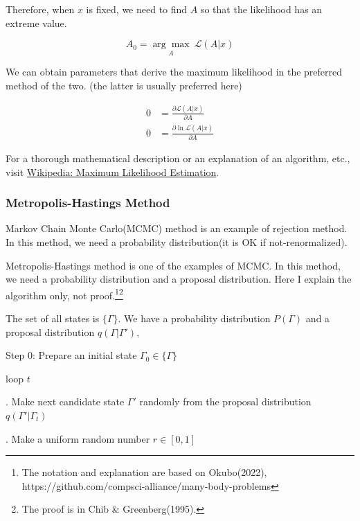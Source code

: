 Therefore, when $x$ is fixed, we need to find $A$ so that the likelihood has an extreme value.

\begin{equation}
    A_0 = \underset{A}{\arg\max} \ {\mathcal{L}(A|x)}
\end{equation}

We can obtain parameters that derive the maximum likelihood in the preferred method of the two. (the latter is usually preferred here)

\begin{subequations}
    \begin{align}
        0 &= \frac{\partial{\mathcal{L}(A|x)}}{\partial A} \\
        0 &= \frac{\partial{\ln{\mathcal{L}(A|x)}}}{\partial A}
    \end{align}
\end{subequations}

For a thorough mathematical description or an explanation of an algorithm, etc., visit \href{https://en.wikipedia.org/wiki/Maximum_likelihood_estimation}{Wikipedia: Maximum Likelihood Estimation}.

\subsubsection{Metropolis-Hastings Method}

Markov Chain Monte Carlo(MCMC) method is an example of rejection method. In this method, we need a probability distribution(it is OK if not-renormalized).

Metropolis-Hastings method is one of the examples of MCMC. In this method, we need a probability distribution and a proposal distribution. Here I explain the algorithm only, not proof.\footnote{The notation and explanation are based on Okubo(2022), https://github.com/compsci-alliance/many-body-problems}\footnote{The proof is in Chib \& Greenberg(1995).}

The set of all states is $\{ \Gamma \}$. We have a probability distribution $P(\Gamma)$ and a proposal distribution $q(\Gamma | \Gamma')$,

Step 0: Prepare an initial state $\Gamma_0 \in \{ \Gamma \}$

\quad loop $t$

. Make next candidate state $\Gamma'$ randomly from the proposal distribution $q(\Gamma' | \Gamma_t)$

. Make a uniform random number $r \in [0,1]$

